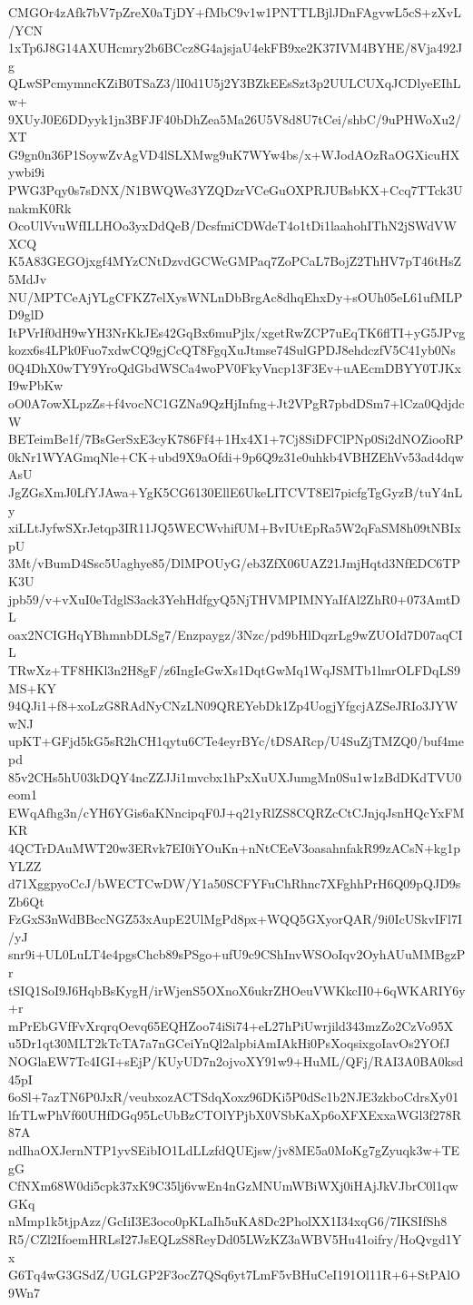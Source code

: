 CMGOr4zAfk7bV7pZreX0aTjDY+fMbC9v1w1PNTTLBjlJDnFAgvwL5cS+zXvL/YCN
1xTp6J8G14AXUHcmry2b6BCcz8G4ajsjaU4ekFB9xe2K37IVM4BYHE/8Vja492Jg
QLwSPcmymncKZiB0TSaZ3/lI0d1U5j2Y3BZkEEsSzt3p2UULCUXqJCDlyeEIhLw+
9XUyJ0E6DDyyk1jn3BFJF40bDhZea5Ma26U5V8d8U7tCei/shbC/9uPHWoXu2/XT
G9gn0n36P1SoywZvAgVD4lSLXMwg9uK7WYw4bs/x+WJodAOzRaOGXicuHXywbi9i
PWG3Pqy0s7sDNX/N1BWQWe3YZQDzrVCeGuOXPRJUBsbKX+Ccq7TTck3UnakmK0Rk
OcoUlVvuWfILLHOo3yxDdQeB/DcsfmiCDWdeT4o1tDi1laahohIThN2jSWdVWXCQ
K5A83GEGOjxgf4MYzCNtDzvdGCWcGMPaq7ZoPCaL7BojZ2ThHV7pT46tHsZ5MdJv
NU/MPTCeAjYLgCFKZ7elXysWNLnDbBrgAc8dhqEhxDy+sOUh05eL61ufMLPD9glD
ItPVrIf0dH9wYH3NrKkJEs42GqBx6muPjlx/xgetRwZCP7uEqTK6flTI+yG5JPvg
kozx6s4LPk0Fuo7xdwCQ9gjCcQT8FgqXuJtmse74SulGPDJ8ehdczfV5C41yb0Ns
0Q4DhX0wTY9YroQdGbdWSCa4woPV0FkyVncp13F3Ev+uAEcmDBYY0TJKxI9wPbKw
oO0A7owXLpzZs+f4vocNC1GZNa9QzHjInfng+Jt2VPgR7pbdDSm7+lCza0QdjdcW
BETeimBe1f/7BsGerSxE3cyK786Ff4+1Hx4X1+7Cj8SiDFClPNp0Si2dNOZiooRP
0kNr1WYAGmqNle+CK+ubd9X9aOfdi+9p6Q9z31e0uhkb4VBHZEhVv53ad4dqwAsU
JgZGsXmJ0LfYJAwa+YgK5CG6130EllE6UkeLITCVT8El7picfgTgGyzB/tuY4nLy
xiLLtJyfwSXrJetqp3IR11JQ5WECWvhifUM+BvIUtEpRa5W2qFaSM8h09tNBIxpU
3Mt/vBumD4Ssc5Uaghye85/DlMPOUyG/eb3ZfX06UAZ21JmjHqtd3NfEDC6TPK3U
jpb59/v+vXuI0eTdglS3ack3YehHdfgyQ5NjTHVMPIMNYaIfAl2ZhR0+073AmtDL
oax2NCIGHqYBhmnbDLSg7/Enzpaygz/3Nzc/pd9bHlDqzrLg9wZUOId7D07aqCIL
TRwXz+TF8HKl3n2H8gF/z6IngIeGwXs1DqtGwMq1WqJSMTb1lmrOLFDqLS9MS+KY
94QJi1+f8+xoLzG8RAdNyCNzLN09QREYebDk1Zp4UogjYfgcjAZSeJRIo3JYWwNJ
upKT+GFjd5kG5sR2hCH1qytu6CTe4eyrBYc/tDSARcp/U4SuZjTMZQ0/buf4mepd
85v2CHs5hU03kDQY4ncZZJJi1mvcbx1hPxXuUXJumgMn0Su1w1zBdDKdTVU0eom1
EWqAfhg3n/cYH6YGis6aKNncipqF0J+q21yRlZS8CQRZcCtCJnjqJsnHQcYxFMKR
4QCTrDAuMWT20w3ERvk7EI0iYOuKn+nNtCEeV3oasahnfakR99zACsN+kg1pYLZZ
d71XggpyoCcJ/bWECTCwDW/Y1a50SCFYFuChRhnc7XFghhPrH6Q09pQJD9sZb6Qt
FzGxS3nWdBBccNGZ53xAupE2UlMgPd8px+WQQ5GXyorQAR/9i0IcUSkvIFl7I/yJ
snr9i+UL0LuLT4e4pgsChcb89sPSgo+ufU9c9CShInvWSOoIqv2OyhAUuMMBgzPr
tSIQ1SoI9J6HqbBsKygH/irWjenS5OXnoX6ukrZHOeuVWKkcII0+6qWKARIY6y+r
mPrEbGVfFvXrqrqOevq65EQHZoo74iSi74+eL27hPiUwrjild343mzZo2CzVo95X
u5Dr1qt30MLT2kTcTA7a7nGCeiYnQl2alpbiAmIAkHi0PsXoqsixgoIavOs2YOfJ
NOGlaEW7Tc4IGI+sEjP/KUyUD7n2ojvoXY91w9+HuML/QFj/RAI3A0BA0ksd45pI
6oSl+7azTN6P0JxR/veubxozACTSdqXoxz96DKi5P0dSc1b2NJE3zkboCdrsXy01
lfrTLwPhVf60UHfDGq95LcUbBzCTOlYPjbX0VSbKaXp6oXFXExxaWGl3f278R87A
ndIhaOXJernNTP1yvSEibIO1LdLLzfdQUEjsw/jv8ME5a0MoKg7gZyuqk3w+TEgG
CfNXm68W0di5cpk37xK9C35lj6vwEn4nGzMNUmWBiWXj0iHAjJkVJbrC0l1qwGKq
nMmp1k5tjpAzz/GcIiI3E3oco0pKLaIh5uKA8Dc2PholXX1I34xqG6/7IKSIfSh8
R5/CZl2IfoemHRLsI27JsEQLzS8ReyDd05LWzKZ3aWBV5Hu41oifry/HoQvgd1Yx
G6Tq4wG3GSdZ/UGLGP2F3ocZ7QSq6yt7LmF5vBHuCeI191Ol11R+6+StPAlO9Wn7
